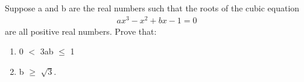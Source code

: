 \item Suppose a and b are the real numbers such that the roots of the cubic equation
\begin{align} 
ax^3 - x^2 + bx - 1 = 0
\end{align}
are all positive real numbers. Prove that:
\begin{enumerate}
\item 0 $<$ 3ab $\leq$ 1
\item b $\geq$ $\sqrt{3}$.
\end{enumerate}

